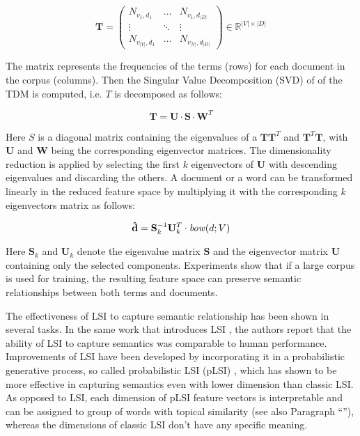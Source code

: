 \begin{equation*}
\mathbf{T} = \left(\begin{matrix}
		N_{v_1, d_1} & \dots & N_{v_1, d_{|D|}} \\
		\vdots & \ddots & \vdots \\
		N_{v_{|V|}, d_1} & \dots & N_{v_{|V|}, d_{|D|}}
	  \end{matrix}\right) \in \mathbb{R}^{|V| \times |D|}
\end{equation*}

The matrix represents the frequencies of the terms (rows) for each document in
the corpus (columns). Then the Singular Value Decomposition (SVD)
\cite{golub1970singular} of of the TDM is computed, i.e. $T$ is decomposed as
follows:

\begin{equation*}
	\mathbf{T} = \mathbf{U}\cdot\mathbf{S}\cdot\mathbf{W}^T
\end{equation*}

Here $S$ is a diagonal matrix containing the eigenvalues of a $\mathbf{T}\mathbf{T}^T$ and
$\mathbf{T}^T\mathbf{T}$, with $\mathbf{U}$ and $\mathbf{W}$ being the corresponding eigenvector
matrices.
The dimensionality reduction is applied by selecting the first $k$ eigenvectors
of $\mathbf{U}$ with descending eigenvalues and discarding the others.
A document or a word can be transformed linearly in the reduced feature space by
multiplying it with the corresponding $k$ eigenvectors matrix as follows:

\begin{equation*}
\mathbf{\hat{d}} = \mathbf{S}_k^{-1}\mathbf{U}_k^T\cdot\mathit{bow}(d; V)
\end{equation*}

Here $\mathbf{S}_k$ and $\mathbf{U}_k$ denote the eigenvalue matrix $\mathbf{S}$ and the eigenvector
matrix $\mathbf{U}$ containing only the selected components. Experiments show that if a large 
corpus is used for training, the resulting feature space can preserve semantic
relationships between both terms and documents. 

The effectiveness of LSI to capture semantic relationship has been shown in
several tasks. In the same work that introduces LSI
\cite{landauer1998introduction}, the authors report that the ability of LSI to
capture semantics was comparable to human performance. Improvements of LSI have
been developed by incorporating it in a probabilistic generative process, 
so called probabilistic LSI (pLSI) \cite{Hofmann1999}, which
has shown to be more effective in capturing semantics even with lower dimension
than classic LSI. As opposed to LSI, each dimension of pLSI feature vectors is interpretable 
and can be assigned to group of words with topical similarity (see also Paragraph
``''), whereas the dimensions of classic LSI don't have any specific meaning.

